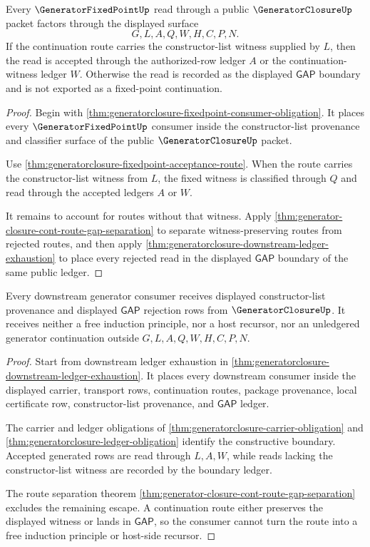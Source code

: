 \begin{theorem}
\label{thm:generatorclosure-fixedpoint-cont-route-exhaustion}
Every $\GeneratorFixedPointUp$ read through a public $\GeneratorClosureUp$ packet factors through the displayed surface
$$
G,L,A,Q,W,H,C,P,N.
$$
If the continuation route carries the constructor-list witness supplied by $L$, then the read is accepted through the authorized-row ledger $A$ or the continuation-witness ledger $W$. Otherwise the read is recorded as the displayed $\mathsf{GAP}$ boundary and is not exported as a fixed-point continuation.
\end{theorem}
\begin{proof}
Begin with \autoref{thm:generatorclosure-fixedpoint-consumer-obligation}. It places every $\GeneratorFixedPointUp$ consumer inside the constructor-list provenance and classifier surface of the public $\GeneratorClosureUp$ packet.

Use \autoref{thm:generatorclosure-fixedpoint-acceptance-route}. When the route carries the constructor-list witness from $L$, the fixed witness is classified through $Q$ and read through the accepted ledgers $A$ or $W$.

It remains to account for routes without that witness. Apply \autoref{thm:generator-closure-cont-route-gap-separation} to separate witness-preserving routes from rejected routes, and then apply \autoref{thm:generatorclosure-downstream-ledger-exhaustion} to place every rejected read in the displayed $\mathsf{GAP}$ boundary of the same public ledger.
\end{proof}

\begin{theorem}
\label{thm:generatorclosure-induction-nonescape-boundary}
Every downstream generator consumer receives displayed constructor-list provenance and displayed $\mathsf{GAP}$ rejection rows from $\GeneratorClosureUp$. It receives neither a free induction principle, nor a host recursor, nor an unledgered generator continuation outside $G,L,A,Q,W,H,C,P,N$.
\end{theorem}
\begin{proof}
Start from downstream ledger exhaustion in \autoref{thm:generatorclosure-downstream-ledger-exhaustion}. It places every downstream consumer inside the displayed carrier, transport rows, continuation routes, package provenance, local certificate row, constructor-list provenance, and $\mathsf{GAP}$ ledger.

The carrier and ledger obligations of \autoref{thm:generatorclosure-carrier-obligation} and \autoref{thm:generatorclosure-ledger-obligation} identify the constructive boundary. Accepted generated rows are read through $L,A,W$, while reads lacking the constructor-list witness are recorded by the boundary ledger.

The route separation theorem \autoref{thm:generator-closure-cont-route-gap-separation} excludes the remaining escape. A continuation route either preserves the displayed witness or lands in $\mathsf{GAP}$, so the consumer cannot turn the route into a free induction principle or host-side recursor.
\end{proof}

